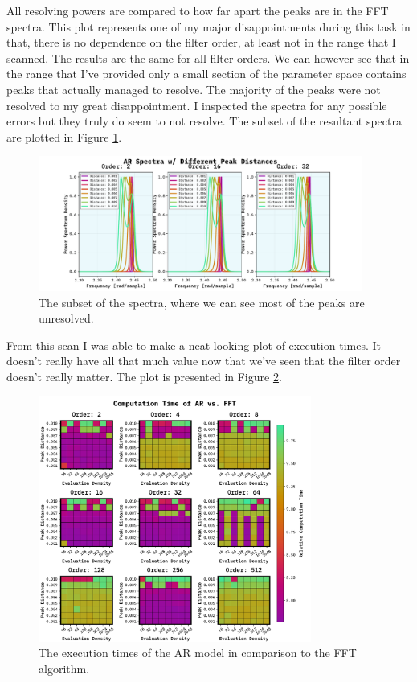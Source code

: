 \documentclass[10pt, titlepage, a4paper]{article}
\begin{document}
All resolving powers are compared to how far apart the peaks are in the FFT spectra. This plot represents one of my major disappointments
during this task in that, there is no dependence on the filter order, at least not in the range that I scanned. The results are 
the same for all filter orders. We can however see that in the range that I've provided only a small section of the parameter 
space contains peaks that actually managed to resolve. The majority of the peaks were not resolved to my great disappointment.
I inspected the spectra for any possible errors but they truly do seem to not resolve. The subset of the resultant spectra 
are plotted in Figure \ref{fig:resolving-power-spectra}.

\begin{figure}[H]
    \centering
    \includegraphics[width=0.95\textwidth]{../MaxEntropy/Images/ar-spectra.pdf}
    \caption{The subset of the spectra, where we can see most of the peaks are unresolved.}
    \label{fig:resolving-power-spectra}
\end{figure}

From this scan I was able to make a neat looking plot of execution times. It doesn't really have all that much value
now that we've seen that the filter order doesn't really matter. The plot is presented in Figure \ref{fig:execution-times}.

\begin{figure}[H]
    \centering
    \includegraphics[width=0.8\textwidth]{../MaxEntropy/Images/time-res.pdf}
    \caption{The execution times of the AR model in comparison to the FFT algorithm.}
    \label{fig:execution-times}
\end{figure}
\end{document}
